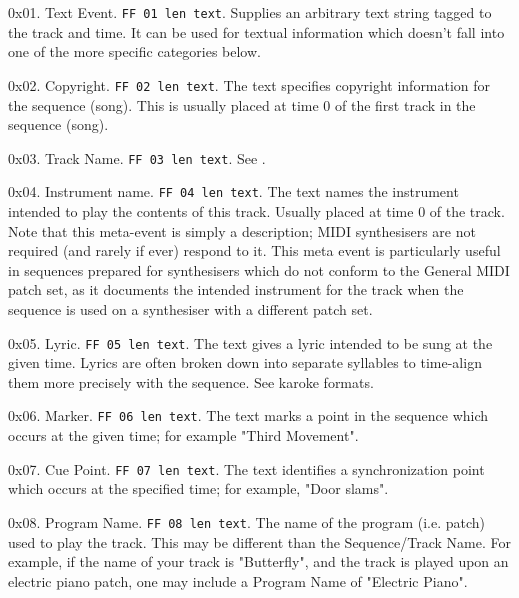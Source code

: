    \begin{enumber}
      \item 0x01.
         Text Event. \texttt{FF 01 len text}.
         Supplies an arbitrary text string tagged to the track and time.
         It can be used for textual information which doesn't fall into
         one of the more specific categories below.
      \item 0x02.
         Copyright. \texttt{FF 02 len text}.
         The text specifies copyright information for the sequence (song).
         This is usually placed at time 0 of the first track in the
         sequence (song).
      \item 0x03.
         Track Name. \texttt{FF 03 len text}.
         See .
      \item 0x04.
         Instrument name. \texttt{FF 04 len text}.
         The text names the instrument intended to play the contents of
         this track. Usually placed at time 0 of the track.
         Note that this meta-event is simply a description; MIDI
         synthesisers are not required (and rarely if ever) respond to it.
         This meta event is particularly useful in sequences prepared
         for synthesisers which do not conform to the General MIDI patch set,
         as it documents the intended instrument for the track when the
         sequence is used on a synthesiser with a different patch set.
      \item 0x05.
         Lyric.  \texttt{FF 05 len text}.
         The text gives a lyric intended to be sung at the given time.
         Lyrics are often broken down into separate syllables to time-align
         them more precisely with the sequence. See karoke formats.
      \item 0x06.
         Marker. \texttt{FF 06 len text}.
         The text marks a point in the sequence which occurs at the
         given time; for example "Third Movement".
      \item 0x07.
         Cue Point. \texttt{FF 07 len text}.
         The text identifies a synchronization point which occurs
         at the specified time; for example, "Door slams".
      \item 0x08.
         Program Name. \texttt{FF 08 len text}.
         The name of the program (i.e. patch) used to play the track.
         This may be different than the Sequence/Track Name.
         For example, if the name of your track is "Butterfly",
         and the track is played upon an electric piano patch,
         one may include a Program Name of "Electric Piano".

\end{enumber}
